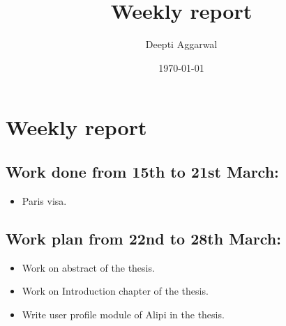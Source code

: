 \documentclass[11pt]{article}
\title{Weekly report}
\author{Deepti Aggarwal}
\date{\today}
\begin{document}
\maketitle

\setcounter{tocdepth}{3}
\vspace*{1cm}
\section{Weekly report}
\label{sec-1}

\subsection{Work done from 15th to 21st March:}
\label{sec-1-1}
\begin{itemize}
\item Paris visa.
\end{itemize}

\subsection{Work plan from 22nd to 28th March:}
\label{sec-1-1}
\begin{itemize}
\item Work on abstract of the thesis. 
\item Work on Introduction chapter of the thesis. 
\item Write user profile module of Alipi in the thesis.
\end{itemize}
\end{document}

